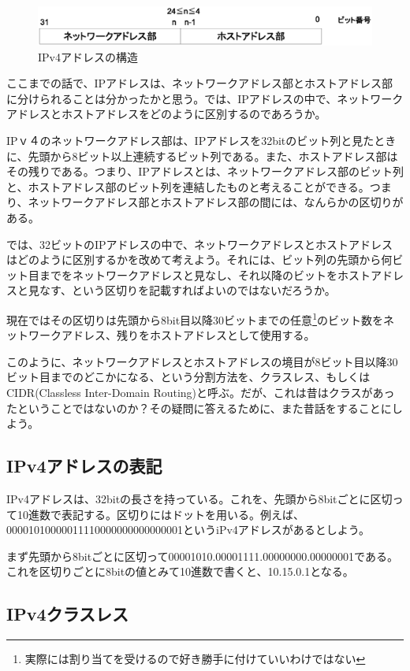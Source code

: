 \begin{figure}[htbp]
	\includegraphics[width=12cm,clip]{draw/ipaddr.eps}
	\caption{IPv4アドレスの構造}
	\label{fig:ipaddr}
\end{figure}

ここまでの話で、IPアドレスは、ネットワークアドレス部とホストアドレス部に分けられることは分かったかと思う。では、IPアドレスの中で、ネットワークアドレスとホストアドレスをどのように区別するのであろうか。

IPｖ４のネットワークアドレス部は、IPアドレスを32bitのビット列と見たときに、先頭から8ビット以上連続するビット列である。また、ホストアドレス部はその残りである。つまり、IPアドレスとは、ネットワークアドレス部のビット列と、ホストアドレス部のビット列を連結したものと考えることができる。つまり、ネットワークアドレス部とホストアドレス部の間には、なんらかの区切りがある。

では、32ビットのIPアドレスの中で、ネットワークアドレスとホストアドレスはどのように区別するかを改めて考えよう。それには、ビット列の先頭から何ビット目までをネットワークアドレスと見なし、それ以降のビットをホストアドレスと見なす、という区切りを記載すればよいのではないだろうか。

現在ではその区切りは先頭から8bit目以降30ビットまでの任意\footnote{実際には割り当てを受けるので好き勝手に付けていいわけではない}のビット数をネットワークアドレス、残りをホストアドレスとして使用する。

このように、ネットワークアドレスとホストアドレスの境目が8ビット目以降30ビット目までのどこかになる、という分割方法を、クラスレス、もしくはCIDR(Classless Inter-Domain Routing)と呼ぶ。だが、これは昔はクラスがあったということではないのか？その疑問に答えるために、また昔話をすることにしよう。

\subsection{IPv4アドレスの表記}
IPv4アドレスは、32bitの長さを持っている。これを、先頭から8bitごとに区切って10進数で表記する。区切りにはドットを用いる。例えば、00001010000011110000000000000001というiPv4アドレスがあるとしよう。

まず先頭から8bitごとに区切って00001010.00001111.00000000.00000001である。これを区切りごとに8bitの値とみて10進数で書くと、10.15.0.1となる。

\subsection{IPv4クラスレス}

